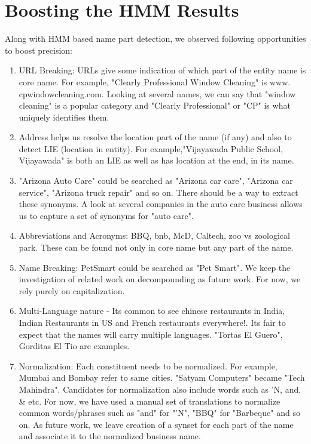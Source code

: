\documentclass{acm_proc_article-sp}
\begin{document}
\section{Boosting the HMM Results}
Along with HMM based name part detection, we observed following opportunities to boost precision:
\begin{enumerate}
\item URL Breaking: URLs give some indication of which part of the entity name is core name. For example, "Clearly Professional Window Cleaning" is www. cpwindowcleaning.com. Looking at several names, we can say that "window cleaning" is a popular category and "Clearly Professional" or "CP" is what uniquely identifies them. 
\item Address helps us resolve the location part of the name (if any) and also to detect LIE (location in entity). For example,"Vijayawada Public School, Vijayawada" is both an LIE as well as has location at the end, in its name.
\item "Arizona Auto Care" could be searched as "Arizona car care", "Arizona car service", "Arizona truck repair" and so on. There should be a way to extract these synonyms. A look at several companies in the auto care business allows us to capture a set of synonyms for "auto care". 
\item Abbreviations and Acronyms: BBQ, bnb, McD, Caltech, zoo vs zoological park. These can be found not only in core name but any part of the name. 
\item Name Breaking: PetSmart could be searched as "Pet Smart". We keep the investigation of related work on decompounding as future work. For now, we rely purely on capitalization.
\item Multi-Language nature - Its common to see chinese restaurants in India, Indian Restaurants in US and French restaurants everywhere!. Its fair to expect that the names will carry multiple languages. "Tortas El Guero", Gorditas El Tio are examples. 
\item Normalization: Each constituent needs to be normalized. For example, Mumbai and Bombay refer to same cities. "Satyam Computers" became "Tech Mahindra". Candidates for normalization also include words such as 'N, and, \& etc. For now, we have used a manual set of translations to normalize common words/phrases such as "and" for "'N", "BBQ" for "Barbeque" and so on. As future work, we leave creation of a synset for each part of the name and associate it to the normalized business name.
\end{enumerate}
\end{document}
